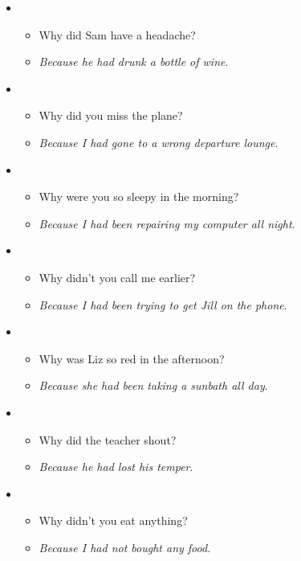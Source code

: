 \begin{itemize}

\item
\begin{itemize}
\item Why did Sam have a headache?
\item \textit{Because he had drunk a bottle of wine}.
\end{itemize}

\item
\begin{itemize}
\item Why did you miss the plane?
\item \textit{Because I had gone to a wrong departure lounge}.
\end{itemize}

\item
\begin{itemize}
\item Why were you so sleepy in the morning?
\item \textit{Because I had been repairing my computer all night}.
\end{itemize}

\item
\begin{itemize}
\item Why didn't you call me earlier?
\item \textit{Because I had been trying to get Jill on the phone}.
\end{itemize}

\item
\begin{itemize}
\item Why was Liz so red in the afternoon? 
\item \textit{Because she had been taking a sunbath all day}.
\end{itemize}

\item
\begin{itemize}
\item Why did the teacher shout?
\item \textit{Because he had lost his temper}.
\end{itemize}

\item
\begin{itemize}
\item Why didn't you eat anything?
\item \textit{Because I had not bought any food}.
\end{itemize}


\end{itemize}
